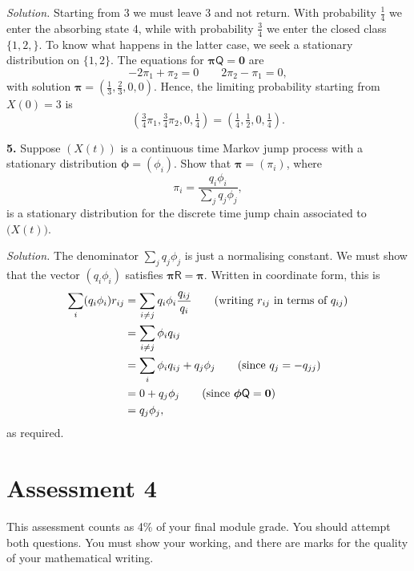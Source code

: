 \documentclass[
  a4paper,
]{article}
\theoremstyle{definition}
\theoremstyle{definition}
\theoremstyle{definition}
\theoremstyle{remark}
\begin{document}
\begin{myanswers}
\emph{Solution.}
Starting from 3 we must leave 3 and not return. With probability \(\frac14\) we enter the absorbing state 4, while with probability \(\frac34\) we enter the closed class \(\{1,2,\}\). To know what happens in the latter case, we seek a stationary distribution on \(\{1,2\}\). The equations for \(\boldsymbol\pi \mathsf Q = \mathbf 0\) are
\[ -2\pi_1 + \pi_2 = 0 \qquad 2\pi_2 - \pi_1 = 0 ,  \]
with solution \(\boldsymbol\pi = (\frac13, \frac23, 0,0)\). Hence, the limiting probability starting from \(X(0) = 3\) is
\[ \left( \tfrac34 \pi_1, \tfrac34 \pi_2, 0, \tfrac14 \right) = \left( \tfrac14, \tfrac12 , 0, \tfrac14 \right) . \]

\end{myanswers}

\textbf{5.} Suppose \((X(t))\) is a continuous time Markov jump process with a stationary distribution \(\boldsymbol\phi = (\phi_i)\). Show that \(\boldsymbol\pi = (\pi_i)\), where
\[ \pi_i = \frac{q_i \phi_i}{\sum_j q_j \phi_j} ,\]
is a stationary distribution for the discrete time jump chain associated to \(\big(X(t)\big)\).

\begin{myanswers}
\emph{Solution.}
The denominator \(\sum_j q_j\phi_j\) is just a normalising constant. We must show that the vector \((q_i\phi_i)\) satisfies \(\boldsymbol\pi\mathsf R = \boldsymbol\pi\). Written in coordinate form, this is
\begin{align*}
\sum_i (q_i\phi_i)r_{ij} &= \sum_{i \neq j}q_i\phi_i \frac{q_{ij}}{q_i} \tag{writing $r_{ij}$ in terms of $q_{ij}$} \\
&= \sum_{i \neq j} \phi_i q_{ij} \\
&= \sum_i \phi_iq_{ij} + q_j\phi_j \tag{since $q_j = -q_{jj}$} \\
&= 0 + q_j\phi_j \tag{since $\boldsymbol\phi\mathsf Q = \mathbf 0$} \\
&= q_j \phi_j ,
\end{align*}
as required.

\end{myanswers}

\hypertarget{A4}{%
\section*{Assessment 4}\label{A4}}

This assessment counts as 4\% of your final module grade. You should attempt both questions. You must show your working, and there are marks for the quality of your mathematical writing.
\end{document}
